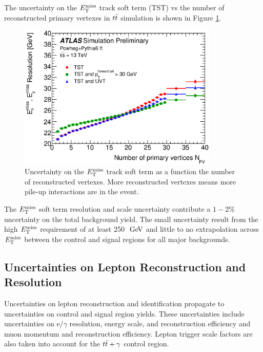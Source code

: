 \indent The uncertainty on the $\met$ track soft term (TST) vs the number of reconstructed primary vertexes in $t\bar{t}$ simulation is shown in Figure \ref{fig:sys:MET_TST_tt}. \\

\begin{figure}[!h]
\begin{center}
\includegraphics[width=0.85\textwidth]{figures/METCalib/MET_TST_tt.eps}
\caption[Uncertainty on the $\met$ track soft term as a function the number of reconstructed vertexes.]{Uncertainty on the $\met$ track soft term as a function the number of reconstructed vertexes.  More reconstructed vertexes means more pile-up interactions are in the event. }
\label{fig:sys:MET_TST_tt}
\end{center}
\end{figure}

\indent The $\met$ soft term resolution and scale uncertainty contribute a $1-2\%$ uncertainty on the total background yield.  The small uncertainty result from the high $\met$ requirement of at least 250 $\gev$ and little to no extrapolation across $\met$ between the control and signal regions for all major backgrounds. \\

\subsection{Uncertainties on Lepton Reconstruction and Resolution}

\indent Uncertainties on lepton reconstruction and identification propagate to uncertainties on control and signal region yields.  These uncertainties include uncertainties on e/$\gamma$ resolution, energy scale, and reconstruction efficiency and muon momentum and reconstruction efficiency.  Lepton trigger scale factors are also taken into account for the $t\bar{t}+\gamma$ control region. \\

